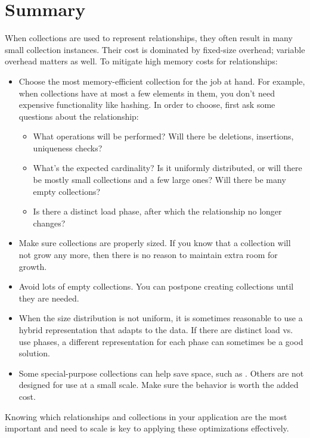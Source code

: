 \FloatBarrier

\section{Summary}

When collections are used to represent relationships, they often result in many
small collection instances. Their cost is dominated by fixed-size
overhead; variable overhead matters as well. To mitigate high memory costs
for relationships:
\begin{itemize}
  \item Choose the most memory-efficient collection for the job at hand. For
  example, when collections have at most a few elements in them, you
  don't need expensive functionality like hashing. In
  order to choose, first ask some questions about the relationship:
  \begin{itemize}
    \item What operations will be performed? Will there be deletions,
    insertions, uniqueness checks?
    \item What's the expected cardinality? Is it uniformly
    distributed, or will there be mostly small
    collections and a few large ones? Will there be many empty collections?
    \item Is there a distinct load phase, after which the relationship no
    longer changes?
  \end{itemize}
  \item Make sure collections are properly sized. If you know that a collection
  will not grow any more, then there is no reason to maintain extra room for
  growth.
  \item Avoid lots of empty collections. You can postpone creating collections
  until they are needed.
 \item When the size distribution is not uniform, it is sometimes reasonable to
 use a hybrid representation that adapts to the data. If there are
 distinct load vs. use phases, a different representation
 for each phase can sometimes be a good solution.
 \item Some special-purpose collections can help save space, such as
 . Others are not
 designed for use at a small scale. Make sure the
 behavior is worth the added cost.
\end{itemize}
Knowing which relationships and collections in your application are the most
important and need to scale is key to applying these optimizations effectively.  





